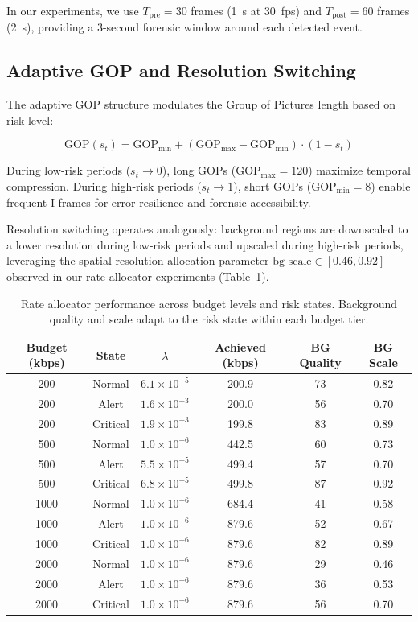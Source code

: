 In our experiments, we use $T_{\text{pre}} = 30$ frames (1~s at 30~fps) and $T_{\text{post}} = 60$ frames (2~s), providing a 3-second forensic window around each detected event.

\subsection{Adaptive GOP and Resolution Switching}
\label{sec:adaptive}

The adaptive GOP structure modulates the Group of Pictures length based on risk level:

\begin{equation}
\text{GOP}(s_t) = \text{GOP}_{\min} + (\text{GOP}_{\max} - \text{GOP}_{\min}) \cdot (1 - s_t)
\end{equation}

During low-risk periods ($s_t \to 0$), long GOPs ($\text{GOP}_{\max} = 120$) maximize temporal compression. During high-risk periods ($s_t \to 1$), short GOPs ($\text{GOP}_{\min} = 8$) enable frequent I-frames for error resilience and forensic accessibility.

Resolution switching operates analogously: background regions are downscaled to a lower resolution during low-risk periods and upscaled during high-risk periods, leveraging the spatial resolution allocation parameter $\text{bg\_scale} \in [0.46, 0.92]$ observed in our rate allocator experiments (Table~\ref{tab:rate_allocator}).

\begin{table}[t]
\centering
\caption{Rate allocator performance across budget levels and risk states. Background quality and scale adapt to the risk state within each budget tier.}
\label{tab:rate_allocator}
\begin{tabular}{cccccc}
\toprule
Budget (kbps) & State & $\lambda$ & Achieved (kbps) & BG Quality & BG Scale \\
\midrule
200 & Normal   & $6.1 \times 10^{-5}$ & 200.9 & 73 & 0.82 \\
200 & Alert    & $1.6 \times 10^{-3}$ & 200.0 & 56 & 0.70 \\
200 & Critical & $1.9 \times 10^{-3}$ & 199.8 & 83 & 0.89 \\
\midrule
500 & Normal   & $1.0 \times 10^{-6}$ & 442.5 & 60 & 0.73 \\
500 & Alert    & $5.5 \times 10^{-5}$ & 499.4 & 57 & 0.70 \\
500 & Critical & $6.8 \times 10^{-5}$ & 499.8 & 87 & 0.92 \\
\midrule
1000 & Normal   & $1.0 \times 10^{-6}$ & 684.4 & 41 & 0.58 \\
1000 & Alert    & $1.0 \times 10^{-6}$ & 879.6 & 52 & 0.67 \\
1000 & Critical & $1.0 \times 10^{-6}$ & 879.6 & 82 & 0.89 \\
\midrule
2000 & Normal   & $1.0 \times 10^{-6}$ & 879.6 & 29 & 0.46 \\
2000 & Alert    & $1.0 \times 10^{-6}$ & 879.6 & 36 & 0.53 \\
2000 & Critical & $1.0 \times 10^{-6}$ & 879.6 & 56 & 0.70 \\
\bottomrule
\end{tabular}
\end{table}

